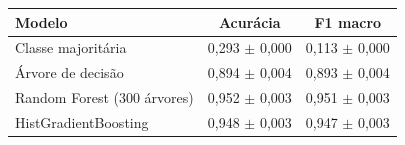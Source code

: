 \begin{tabular}{lcc}
\toprule
Modelo & Acurácia & F1 macro \\
\midrule
Classe majoritária & 0,293 $\pm$ 0,000 & 0,113 $\pm$ 0,000 \\
Árvore de decisão & 0,894 $\pm$ 0,004 & 0,893 $\pm$ 0,004 \\
Random Forest (300 árvores) & 0,952 $\pm$ 0,003 & 0,951 $\pm$ 0,003 \\
HistGradientBoosting & 0,948 $\pm$ 0,003 & 0,947 $\pm$ 0,003 \\
\bottomrule
\end{tabular}
